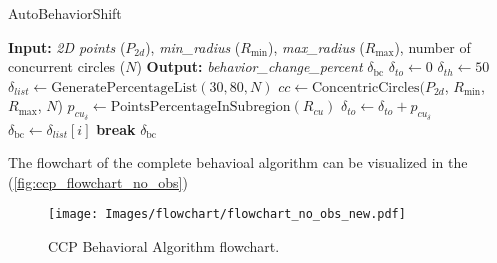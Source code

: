\begin{algorithm}[H]
    \caption{AutoBehaviorShift}
    \label{alg:autobehaviorshift}
    \begin{algorithmic}[1]
    \Statex \textbf{Input: }  \textit{2D points} ($P_{2d}$), \textit{min\_radius} ($R_{\text{min}}$),  \textit{max\_radius} ($R_{\text{max}}$), number of concurrent circles ($N$) 
    \Statex \textbf{Output: } \textit{behavior\_change\_percent} $\delta_{\text{bc}}$ 
    \newline
    \State $\delta_{to} \leftarrow 0$ 
    \State $\delta_{th} \leftarrow 50$ 
    \State $\delta_{list} \leftarrow \text{GeneratePercentageList}(30, 80, N)$ 
    \State $cc \leftarrow \text{ConcentricCircles}(P_{2d}$, $R_{\text{min}}$, $R_{\text{max}}$, $N$)
        \State $p_{cu_\delta} \leftarrow \text{PointsPercentageInSubregion}(R_{cu})$
        \State $\delta_{to} \leftarrow \delta_{to} + p_{cu_\delta}$
            \State $\delta_{\text{bc}} \leftarrow \delta_{list}[i]$
            \State \textbf{break}
        \EndIf
    \EndFor
    \State \Return $\delta_{\text{bc}}$
    \end{algorithmic}
    \end{algorithm}


The flowchart of the complete behavioal algorithm can be visualized in the (\autoref{fig:ccp_flowchart_no_obs})


\begin{figure}[H]
    \centering
    \texttt{[image: Images/flowchart/flowchart\_no\_obs\_new.pdf]}
    \caption{CCP Behavioral Algorithm flowchart.}
    \label{fig:ccp_flowchart_no_obs}
\end{figure}